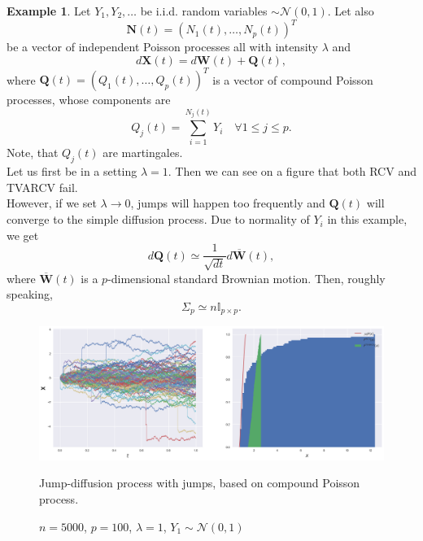 \documentclass[a4paper,11pt]{book}
\theoremstyle{plain}
\theoremstyle{definition}
\newtheorem{exmp}[thm]{Example}
\begin{document}
    \begin{exmp}
    	Let $Y_1, Y_2, \dots$ be i.i.d. random variables $\sim \mathcal{N}(0, 1)$. Let also 
    	\[ \mathbf{N}(t) = (N_1(t), \dots, N_p(t))^T \]
    	be a vector of independent Poisson processes all with intensity $\lambda$ and
    	\[d\mathbf{X}(t) = d\mathbf{W}(t) + \mathbf{Q}(t),  \]
    	where $\mathbf{Q}(t) = (Q_1(t), \dots, Q_p(t))^T $ is a vector of compound Poisson processes, whose components are
    	\[ Q_j(t) = \sum_{i=1}^{N_j(t)} Y_i \quad \forall 1 \leq j \leq p. \]
    	Note, that $Q_j(t)$ are martingales. \\
    	Let us first be in a setting $\lambda = 1$. Then we can see on a figure that both RCV and TVARCV fail. \\
    	However, if we set $\lambda \rightarrow 0$, jumps will happen too frequently and $\mathbf{Q}(t)$ will converge to the simple diffusion process. Due to normality of $Y_i$ in this example, we get
    	\[d\mathbf{Q}(t) \simeq \frac{1}{\sqrt{dt}} d\overline{\mathbf{W}}(t),  \]
    	where $\overline{\mathbf{W}}(t)$ is a $p$-dimensional standard Brownian motion. Then, roughly speaking,
    	\[ \Sigma_p \simeq n \mathbb{I}_{p \times p}. \]
    \end{exmp}
    
    
    \begin{figure}[ht]
    	\begin{center} \centering
    		\includegraphics[scale=0.4]{Xjumps}
    		\caption{$n = 5000$, $p = 100$, $\lambda = 1$, $Y_1 \sim \mathcal{N}(0, 1)$}
    		\smallskip
    		\small
    		Jump-diffusion process with jumps, based on compound Poisson process.
    	\end{center}
    \end{figure}
    
\end{document}
